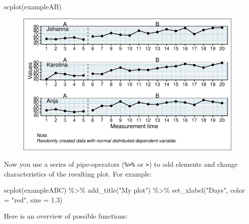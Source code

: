\documentclass[
  letterpaper,
  DIV=11,
  numbers=noendperiod]{scrreprt}
\newenvironment{Shaded}{\begin{snugshade}}{\end{snugshade}}
\newcommand{\AttributeTok}[1]{\textcolor[rgb]{0.40,0.45,0.13}{#1}}
\newcommand{\FloatTok}[1]{\textcolor[rgb]{0.68,0.00,0.00}{#1}}
\newcommand{\FunctionTok}[1]{\textcolor[rgb]{0.28,0.35,0.67}{#1}}
\newcommand{\NormalTok}[1]{\textcolor[rgb]{0.00,0.23,0.31}{#1}}
\newcommand{\SpecialCharTok}[1]{\textcolor[rgb]{0.37,0.37,0.37}{#1}}
\newcommand{\StringTok}[1]{\textcolor[rgb]{0.13,0.47,0.30}{#1}}
\begin{document}
\begin{Shaded}
\begin{Highlighting}[]
\FunctionTok{scplot}\NormalTok{(exampleAB)}
\end{Highlighting}
\end{Shaded}

\begin{figure}[H]

{\centering \includegraphics{./ch_scplot_files/figure-pdf/scplot-basic-1-1.pdf}

}

\end{figure}

Now you use a series of pipe-operators (\texttt{\%\textgreater{}\%} or
\texttt{\textbar{}\textgreater{}}) to add elements and change
characteristics of the resulting plot. For example:

\begin{Shaded}
\begin{Highlighting}[]
\FunctionTok{scplot}\NormalTok{(exampleABC) }\SpecialCharTok{\%\textgreater{}\%}
  \FunctionTok{add\_title}\NormalTok{(}\StringTok{"My plot"}\NormalTok{) }\SpecialCharTok{\%\textgreater{}\%}
  \FunctionTok{set\_xlabel}\NormalTok{(}\StringTok{"Days"}\NormalTok{, }\AttributeTok{color =} \StringTok{"red"}\NormalTok{, }\AttributeTok{size =} \FloatTok{1.3}\NormalTok{)}
\end{Highlighting}
\end{Shaded}

Here is an overview of possible functions:
\end{document}
